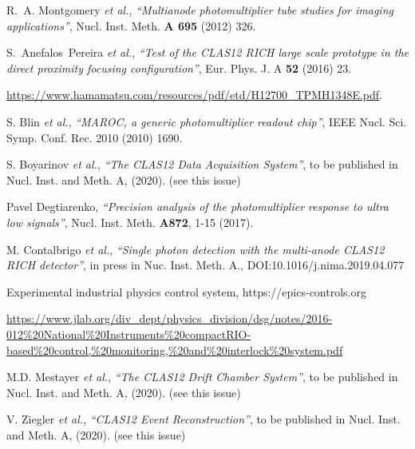 \documentclass[5p,times,twocolumn]{elsarticle}
\begin{document}
\begin{thebibliography}{00}
R.~A. Montgomery {\it et al.}, {\it ``Multianode photomultiplier tube studies for imaging applications''},
Nucl. Inst. Meth. {\bf A 695} (2012) 326.

S.~Anefalos~Pereira {\it et al.}, {\it ``Test of the CLAS12 RICH large scale prototype in the direct proximity focusing configuration''},
Eur. Phys. J. A {\bf 52} (2016) 23.

 \url{https://www.hamamatsu.com/resources/pdf/etd/H12700\_TPMH1348E.pdf}.

 S. Blin {\it et al.}, {\it ``MAROC, a generic photomultiplier readout chip''},
IEEE Nucl. Sci. Symp. Conf. Rec. 2010 (2010) 1690.

S. Boyarinov {\it et al.}, {\it ``The CLAS12 Data Acquisition System''}, 
to be published in Nucl. Inst. and Meth. A, (2020). (see this issue)

Pavel Degtiarenko, {\it ``Precision analysis of the photomultiplier response to ultra low signals''}, 
Nucl. Inst. Meth. {\bf A872}, 1-15  (2017).

M. Contalbrigo {\it et al.}, {\it ``Single photon detection with the multi-anode CLAS12 RICH detector''}, 
in press in Nuc. Inst. Meth. A.,
DOI:10.1016/j.nima.2019.04.077

 Experimental industrial physics control system, https://epics-controls.org

 \url{https://www.jlab.org/div_dept/physics_division/dsg/notes/2016-012%20National%20Instruments%20compactRIO-based%20control,%20monitoring,%20and%20interlock%20system.pdf}

M.D. Mestayer {\it et al.}, {\it ``The CLAS12 Drift Chamber System''}, to be published in Nucl. Inst.
and Meth. A, (2020). (see this issue)

V. Ziegler {\it et al.}, {\it ``CLAS12 Event Reconstruction''}, to be published in Nucl. Inst.
and Meth. A, (2020). (see this issue)
  
\end{thebibliography}
\end{document}
